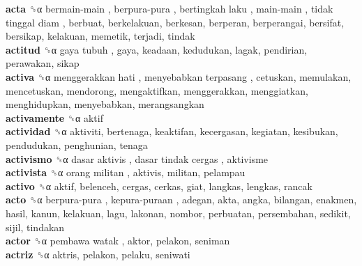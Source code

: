 \textbf{acta} ␝α   bermain-main ,  berpura-pura ,  bertingkah laku ,  main-main ,  tidak tinggal diam , berbuat, berkelakuan, berkesan, berperan, berperangai, bersifat, bersikap, kelakuan, memetik, terjadi, tindak  \\
\textbf{actitud} ␝α   gaya tubuh , gaya, keadaan, kedudukan, lagak, pendirian, perawakan, sikap  \\
\textbf{activa} ␝α   menggerakkan hati ,  menyebabkan terpasang , cetuskan, memulakan, mencetuskan, mendorong, mengaktifkan, menggerakkan, menggiatkan, menghidupkan, menyebabkan, merangsangkan  \\
\textbf{activamente} ␝α  aktif  \\
\textbf{actividad} ␝α  aktiviti, bertenaga, keaktifan, kecergasan, kegiatan, kesibukan, pendudukan, penghunian, tenaga  \\
\textbf{activismo} ␝α   dasar aktivis ,  dasar tindak cergas , aktivisme  \\
\textbf{activista} ␝α   orang militan , aktivis, militan, pelampau  \\
\textbf{activo} ␝α  aktif, belenceh, cergas, cerkas, giat, langkas, lengkas, rancak  \\
\textbf{acto} ␝α   berpura-pura ,  kepura-puraan , adegan, akta, angka, bilangan, enakmen, hasil, kanun, kelakuan, lagu, lakonan, nombor, perbuatan, persembahan, sedikit, sijil, tindakan  \\
\textbf{actor} ␝α   pembawa watak , aktor, pelakon, seniman  \\
\textbf{actriz} ␝α  aktris, pelakon, pelaku, seniwati  \\
